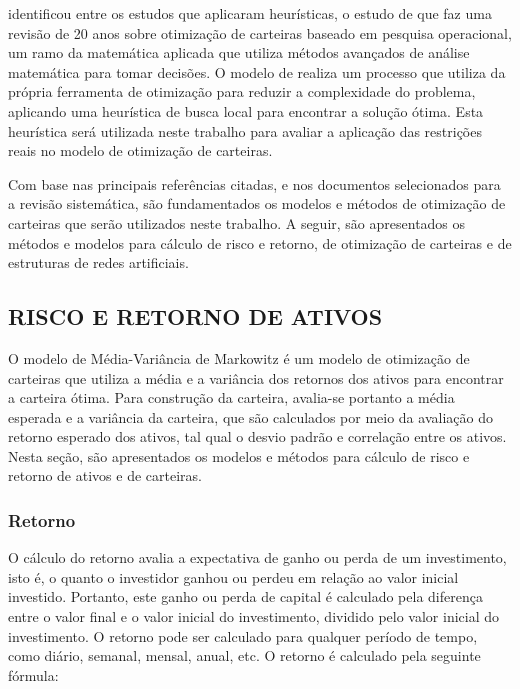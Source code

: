             \ipar {} identificou entre os estudos que aplicaram heurísticas, o estudo de  que faz uma revisão de 20 anos sobre otimização de carteiras baseado em pesquisa operacional, um ramo da matemática aplicada que utiliza métodos avançados de análise matemática para tomar decisões. O modelo de  realiza um processo que utiliza da própria ferramenta de otimização para reduzir a complexidade do problema, aplicando uma heurística de busca local para encontrar a solução ótima. Esta heurística será utilizada neste trabalho para avaliar a aplicação das restrições reais no modelo de otimização de carteiras.

        \ipar Com base nas principais referências citadas, e nos documentos selecionados para a revisão sistemática, são fundamentados os modelos e métodos de otimização de carteiras que serão utilizados neste trabalho. A seguir, são apresentados os métodos e modelos para cálculo de risco e retorno, de otimização de carteiras e de estruturas de redes artificiais.
        
    \subsection{RISCO E RETORNO DE ATIVOS}
        \label{sec:retorno}

        \ipar O modelo de Média-Variância de Markowitz é um modelo de otimização de carteiras que utiliza a média e a variância dos retornos dos ativos para encontrar a carteira ótima. Para construção da carteira, avalia-se portanto a média esperada e a variância da carteira, que são calculados por meio da avaliação do retorno esperado dos ativos, tal qual o desvio padrão e correlação entre os ativos. Nesta seção, são apresentados os modelos e métodos para cálculo de risco e retorno de ativos e de carteiras.

        \subsubsection{Retorno}
            
            \ipar O cálculo do retorno avalia a expectativa de ganho ou perda de um investimento, isto é, o quanto o investidor ganhou ou perdeu em relação ao valor inicial investido. Portanto, este ganho ou perda de capital é calculado pela diferença entre o valor final e o valor inicial do investimento, dividido pelo valor inicial do investimento. O retorno pode ser calculado para qualquer período de tempo, como diário, semanal, mensal, anual, etc. O retorno é calculado pela seguinte fórmula:

